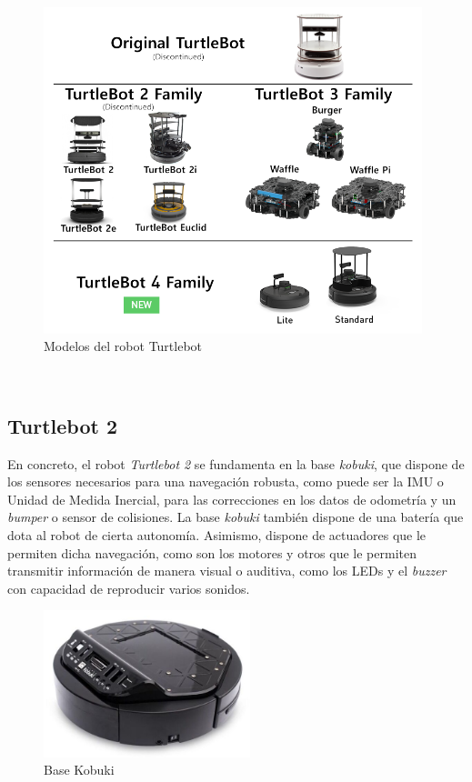 \begin{figure} [h!]
  \begin{center}
    \includegraphics[width=11cm]{figs/turtlebot_family}
  \end{center}
  \caption{Modelos del robot Turtlebot \citep{turtlebot4}}
  \label{fig:turtlebots}
\end{figure}\

\subsection{Turtlebot 2}
\label{sec:turtlebot2}

En concreto, el robot \textit{Turtlebot 2} se fundamenta en la base
\textit{kobuki}, que dispone de los sensores necesarios para una navegación
robusta, como puede ser la IMU o Unidad de Medida Inercial, para las
correcciones en los datos de odometría y un \textit{bumper} o sensor de
colisiones.
La base \textit{kobuki} también dispone de una batería que dota al robot de
cierta autonomía.
Asimismo, dispone de actuadores que le permiten dicha navegación, como son los
motores y otros que le permiten transmitir información de manera visual o
auditiva, como los LEDs y el \textit{buzzer} con capacidad de reproducir varios
sonidos.

\begin{figure} [h!]
  \begin{center}
    \includegraphics[width=6cm]{figs/kobuki_base}
  \end{center}
  \caption{Base Kobuki \citep{kobuki_base}}
  \label{fig:base_kobuki}
\end{figure}\

